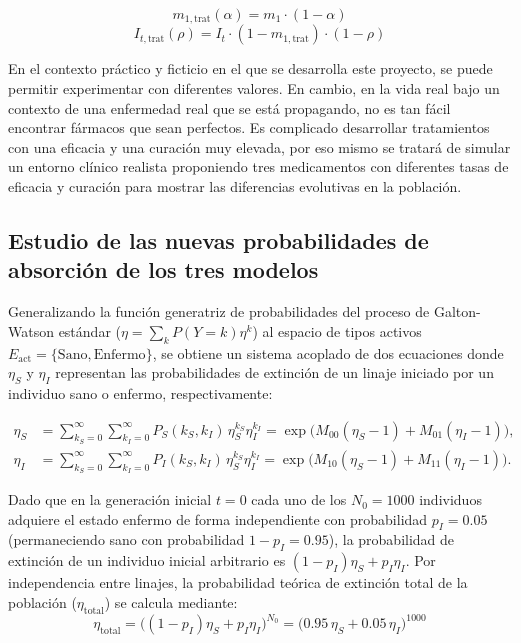 \documentclass[graybox]{SNmult}
\begin{document}
	\begin{equation}
		m_{1,\text{trat}}(\alpha) = m_1 \cdot (1 - \alpha)
	\end{equation}
	\begin{equation}
		I_{t,\text{trat}}(\rho) = I_t \cdot (1 - m_{1,\text{trat}}) \cdot (1 - \rho)
	\end{equation}
	
	En el contexto práctico y ficticio en el que se desarrolla este proyecto, se puede permitir experimentar con diferentes valores. En cambio, en la vida real bajo un contexto de una enfermedad real que se está propagando, no es tan fácil encontrar fármacos que sean perfectos. Es complicado desarrollar tratamientos con una eficacia y una curación muy elevada, por eso mismo se tratará de simular un entorno clínico realista proponiendo tres medicamentos con diferentes tasas de eficacia y curación para mostrar las diferencias evolutivas en la población. 
	
	\subsection{Estudio de las nuevas probabilidades de absorción de los tres modelos}
	\label{subsec:estudio_absorcion_modelos}
	
	Generalizando la función generatriz de probabilidades del proceso de Galton-Watson estándar ($\eta = \sum_{k} P(Y=k)\eta^k$) al espacio de tipos activos $E_{\text{act}} = \{\text{Sano}, \text{Enfermo}\}$, se obtiene un sistema acoplado de dos ecuaciones donde $\eta_S$ y $\eta_I$ representan las probabilidades de extinción de un linaje iniciado por un individuo sano o enfermo, respectivamente:
	
	\begin{align}
		\eta_S &= \sum_{k_S=0}^{\infty} \sum_{k_I=0}^{\infty} P_S(k_S, k_I) \, \eta_S^{k_S} \eta_I^{k_I} = \exp\Big( M_{00}(\eta_S - 1) + M_{01}(\eta_I - 1) \Big), \\
		\eta_I &= \sum_{k_S=0}^{\infty} \sum_{k_I=0}^{\infty} P_I(k_S, k_I) \, \eta_S^{k_S} \eta_I^{k_I} = \exp\Big( M_{10}(\eta_S - 1) + M_{11}(\eta_I - 1) \Big).
	\end{align}
	
	Dado que en la generación inicial $t=0$ cada uno de los $N_0 = 1000$ individuos adquiere el estado enfermo de forma independiente con probabilidad $p_I = 0.05$ (permaneciendo sano con probabilidad $1 - p_I = 0.95$), la probabilidad de extinción de un individuo inicial arbitrario es $(1 - p_I)\eta_S + p_I\eta_I$. Por independencia entre linajes, la probabilidad teórica de extinción total de la población ($\eta_{\text{total}}$) se calcula mediante:
	\begin{equation}
		\eta_{\text{total}} = \Big( (1 - p_I)\eta_S + p_I\eta_I \Big)^{N_0} = \big( 0.95\,\eta_S + 0.05\,\eta_I \big)^{1000}
	\end{equation}
	
\end{document}
